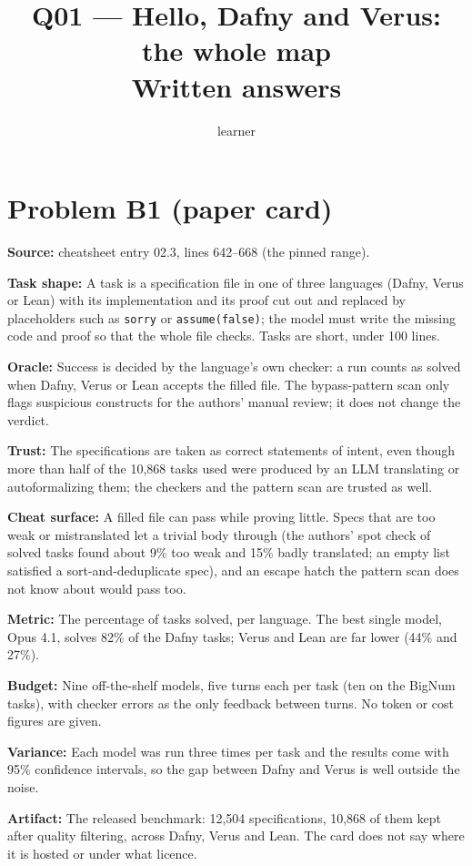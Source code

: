 \documentclass[11pt]{article}
\title{Q01 --- Hello, Dafny and Verus: the whole map \\ \large Written answers}
\author{learner}
\date{}
\begin{document}
\maketitle

\section*{Problem B1 (paper card)}\label{ans:B1}
\begin{answer}
\textbf{Source:} cheatsheet entry 02.3, lines 642--668 (the pinned range).

\textbf{Task shape:} A task is a specification file in one of three languages
(Dafny, Verus or Lean) with its implementation and its proof cut out and
replaced by placeholders such as \texttt{sorry} or \texttt{assume(false)}; the
model must write the missing code and proof so that the whole file checks.
Tasks are short, under 100 lines.

\textbf{Oracle:} Success is decided by the language's own checker: a run
counts as solved when Dafny, Verus or Lean accepts the filled file. The
bypass-pattern scan only flags suspicious constructs for the authors' manual
review; it does not change the verdict.

\textbf{Trust:} The specifications are taken as correct statements of intent,
even though more than half of the 10,868 tasks used were produced by an LLM
translating or autoformalizing them; the checkers and the pattern scan are
trusted as well.

\textbf{Cheat surface:} A filled file can pass while proving little. Specs
that are too weak or mistranslated let a trivial body through (the authors'
spot check of solved tasks found about 9\% too weak and 15\% badly translated;
an empty list satisfied a sort-and-deduplicate spec), and an escape hatch the
pattern scan does not know about would pass too.

\textbf{Metric:} The percentage of tasks solved, per language. The best single
model, Opus 4.1, solves 82\% of the Dafny tasks; Verus and Lean are far lower
(44\% and 27\%).

\textbf{Budget:} Nine off-the-shelf models, five turns each per task (ten on
the BigNum tasks), with checker errors as the only feedback between turns. No
token or cost figures are given.

\textbf{Variance:} Each model was run three times per task and the results come
with 95\% confidence intervals, so the gap between Dafny and Verus is well
outside the noise.

\textbf{Artifact:} The released benchmark: 12,504 specifications, 10,868 of
them kept after quality filtering, across Dafny, Verus and Lean. The card does
not say where it is hosted or under what licence.
\end{answer}
\end{document}
